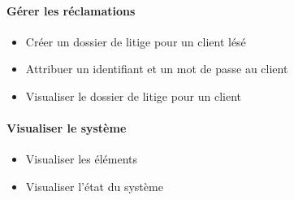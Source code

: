 {\paragraph{Gérer les réclamations}
\begin{itemize}
	\item Créer un dossier de litige pour un client lésé
	\item Attribuer un identifiant et un mot de passe au client
	\item Visualiser le dossier de litige pour un client
\end{itemize}

\paragraph{Visualiser le système}
\begin{itemize}
	\item Visualiser les éléments
	\item Visualiser l'état du système
\end{itemize}

}

